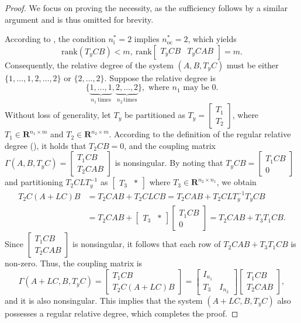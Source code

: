 \documentclass[sort&compress]{elsarticle}
\newcommand\GAmma{\mathit\Gamma}
\newcommand\nsharp{n_\mathrm i^*}
\newcommand\nocstar{n_\mathrm{oc}^*}
\newcommand\rank{\mathrm{rank}}
\newcommand\R{\mathbf R}
\begin{document}
\begin{proof}
We focus on proving the necessity, as the sufficiency follows by a similar argument and is thus omitted for brevity.

According to , the condition $\nsharp=2$ implies $\nocstar=2$, which yields
\[
\rank(T_yCB)<m, \ \rank\begin{bmatrix}T_yCB & T_yCAB\end{bmatrix}=m.
\]
Consequently, the relative degree of the system $(A,B,T_yC)$ must be either $\{1,\dots,1,2,\dots,2\}$ or $\{2,\dots,2\}$.
Suppose the relative degree is
\[
\{\underbrace{1,\dots,1}_{n_1\,\mathrm{times}}, \underbrace{2,\dots,2}_{n_2\,\mathrm{times}}\},
\text{ where $n_1$ may be $0$.}
\]
Without loss of generality, let $T_y$ be partitioned as $T_y=\begin{bmatrix}T_1\\ T_2\end{bmatrix}$, where $T_1\in\R^{n_1\times m}$ and $T_2\in\R^{n_2\times m}$.
According to the definition of the regular relative degree (), it holds that $T_2CB=0$, and the coupling matrix
$\GAmma(A,B,T_yC)=\begin{bmatrix}T_1CB\\ T_2CAB\end{bmatrix}$
is nonsingular. By noting that $T_yCB = \begin{bmatrix}T_1CB \\ 0\end{bmatrix}$ and partitioning $T_2CLT_y^{-1}$ as $\begin{bmatrix}T_3 & *\end{bmatrix}$ where $T_3\in\R^{n_2\times n_1}$, we obtain
\begin{align*}
T_2C(A+LC)B
&= T_2CAB + T_2CLCB
= T_2CAB + T_2CLT_y^{-1}T_yCB \\
&= T_2CAB + \begin{bmatrix}T_3 & *\end{bmatrix} \begin{bmatrix}T_1CB \\ 0\end{bmatrix}
= T_2CAB + T_3T_1CB.
\end{align*}
Since $\begin{bmatrix}T_1CB \\ T_2CAB\end{bmatrix}$ is nonsingular, it follows that each row of $T_2CAB + T_3T_1CB$ is non-zero.
Thus, the coupling matrix is
\[
\GAmma(A+LC,B,T_yC) = \begin{bmatrix}T_1CB \\ T_2C(A+LC)B\end{bmatrix} = \begin{bmatrix}I_{n_1} & \\ T_3 & I_{n_2}\end{bmatrix} \begin{bmatrix}T_1CB \\ T_2CAB\end{bmatrix},
\]
and it is also nonsingular. This implies that the system $(A+LC,B,T_yC)$ also possesses a regular relative degree, which completes the proof.
\end{proof}
\end{document}
